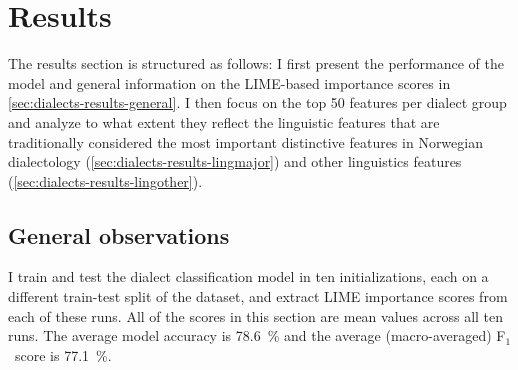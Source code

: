 \section{Results}
\label{sec:dialects-results}

The results section is structured as follows:
I first present the performance of the model and general information on the LIME-based importance scores in \autoref{sec:dialects-results-general}.
I then focus on the top 50 features per dialect group and analyze to what extent they reflect the linguistic features that are traditionally considered the most important distinctive features in Norwegian dialectology (\autoref{sec:dialects-results-lingmajor}) and other linguistics features (\autoref{sec:dialects-results-lingother}).

\subsection{General observations}
\label{sec:dialects-results-general}

I train and test the dialect classification model in ten initializations, each on a different train-test split of the dataset, and extract LIME importance scores from each of these runs.
All of the scores in this section are mean values across all ten runs.
The average model accuracy is 78.6~\% and the average (macro-averaged) F$_1$~score is 77.1~\%.

